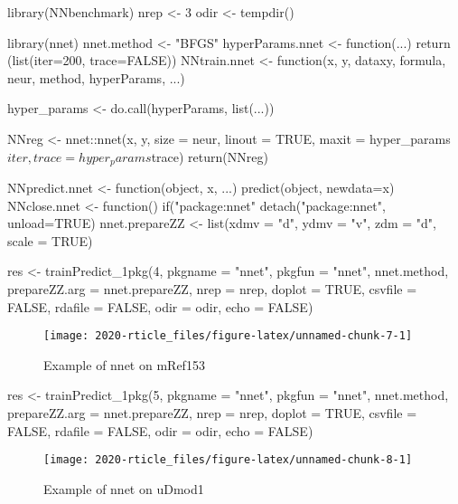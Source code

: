 \begin{Schunk}
\begin{Sinput}
library(NNbenchmark)
nrep <- 3       
odir <- tempdir()

library(nnet)
nnet.method <- "BFGS"
hyperParams.nnet <- function(...) {
    return (list(iter=200, trace=FALSE))
}
NNtrain.nnet <- function(x, y, dataxy, formula, neur, method, hyperParams, ...) {
    
    hyper_params <- do.call(hyperParams, list(...))
    
    NNreg <- nnet::nnet(x, y, size = neur, linout = TRUE, 
                        maxit = hyper_params$iter, trace=hyper_params$trace)
    return(NNreg)
}
NNpredict.nnet  <- function(object, x, ...) { predict(object, newdata=x) }
NNclose.nnet    <- function() {  if("package:nnet" %in% search())
                                detach("package:nnet", unload=TRUE) }
nnet.prepareZZ  <- list(xdmv = "d", ydmv = "v", zdm = "d", scale = TRUE)
\end{Sinput}
\end{Schunk}

\begin{Schunk}
\begin{Sinput}
res <- trainPredict_1pkg(4, pkgname = "nnet", pkgfun = "nnet", nnet.method,
  prepareZZ.arg = nnet.prepareZZ, nrep = nrep, doplot = TRUE,
  csvfile = FALSE, rdafile = FALSE, odir = odir, echo = FALSE)
\end{Sinput}
\begin{figure}

{\centering \texttt{[image: 2020-rticle\_files/figure-latex/unnamed-chunk-7-1]} 

}

\caption[Example of nnet on mRef153]{Example of nnet on mRef153}\label{fig:unnamed-chunk-7}
\end{figure}
\end{Schunk}

\begin{Schunk}
\begin{Sinput}
res <- trainPredict_1pkg(5, pkgname = "nnet", pkgfun = "nnet", nnet.method,
  prepareZZ.arg = nnet.prepareZZ, nrep = nrep, doplot = TRUE,
  csvfile = FALSE, rdafile = FALSE, odir = odir, echo = FALSE)
\end{Sinput}
\begin{figure}

{\centering \texttt{[image: 2020-rticle\_files/figure-latex/unnamed-chunk-8-1]} 

}

\caption[Example of nnet on uDmod1]{Example of nnet on uDmod1}\label{fig:unnamed-chunk-8}
\end{figure}
\end{Schunk}

